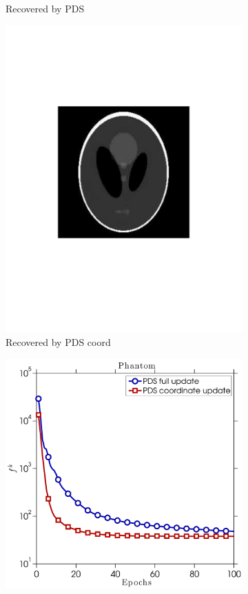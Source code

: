 \begin{figure}[!htb]
\begin{subfigure}{0.45\linewidth}
         \caption{Recovered by PDS}\label{fig:pds_b}		        
        \label{fig:a}
    \end{subfigure} %
    \begin{subfigure}{0.45\linewidth}
    	\centering
        \includegraphics[width=0.9\linewidth]{./figs/phantom_pds_coord_img}
         \caption{Recovered by PDS coord}\label{fig:pds_c}		        
        \label{fig:a}
    \end{subfigure} %
    \quad
    \begin{subfigure}{0.45\linewidth}
    	\centering
        \includegraphics[width=\linewidth]{./figs/phantom_func_val_cropped}

\end{subfigure}
\end{figure}
